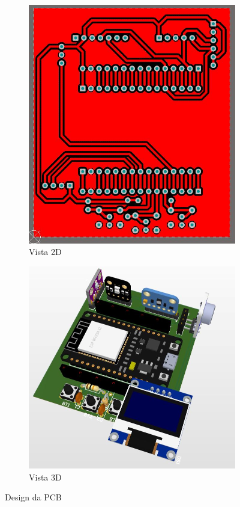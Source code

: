 \documentclass[../monografia.tex]{subfiles}
\begin{document}
\begin{figure}[ht]
	\centering
	\begin{subfigure}{0.5\textwidth}
	  \centering
	  \includegraphics[width=.7\linewidth]{pcb_2}
	  \caption{Vista 2D}
	  \label{fig:sub1}
	\end{subfigure}%
	\begin{subfigure}{0.5\textwidth}
	  \centering
	  \includegraphics[width=.9\linewidth]{hw-3d}
	  \caption{Vista 3D}
	  \label{fig:sub2}
	\end{subfigure}
	\caption{Design da PCB}
	\label{fig:test}
	\end{figure}
\end{document}
